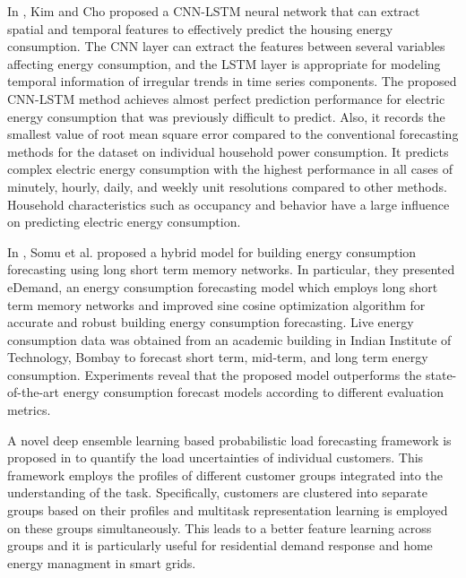 In \cite{KIM201972}, Kim and Cho proposed a CNN-LSTM neural network that can extract spatial and temporal features to effectively predict the housing energy consumption.
The CNN layer can extract the features between several variables affecting energy consumption, and the LSTM layer is appropriate for modeling temporal information of irregular trends in time series components.
The proposed CNN-LSTM method achieves almost perfect prediction performance for electric energy consumption that was previously difficult to predict.
Also, it records the smallest value of root mean square error compared to the conventional forecasting methods for the dataset on individual household power consumption.
It predicts complex electric energy consumption with the highest performance in all cases of minutely, hourly, daily, and weekly unit resolutions compared to other methods.
Household characteristics such as occupancy and behavior have a large influence on predicting electric energy consumption.

In \cite{SOMU2020114131}, Somu et al. proposed a hybrid model for building energy consumption forecasting using long short term memory networks.
In particular, they presented eDemand, an energy consumption forecasting model which employs long short term memory networks and improved sine cosine optimization algorithm for accurate and robust building energy consumption forecasting.
Live energy consumption data was obtained from an academic building in Indian Institute of Technology, Bombay to forecast short term, mid-term, and long term energy consumption.
Experiments reveal that the proposed model outperforms the state-of-the-art energy consumption forecast models according to different evaluation metrics.

A novel deep ensemble learning based probabilistic load forecasting framework is proposed in \cite{YANG2019116324} to quantify the load uncertainties of individual customers.
This framework employs the profiles of different customer groups integrated into the understanding of the task.
Specifically, customers are clustered into separate groups based on their profiles and multitask representation learning is employed on these groups simultaneously.
This leads to a better feature learning across groups and it is particularly useful for residential demand response and home energy managment in smart grids.

